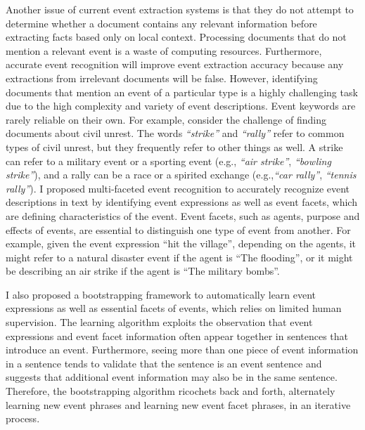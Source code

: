 Another issue of current event extraction systems is 
that they do not 
attempt to determine whether a document 
contains any relevant information 
before extracting facts based only on local context. 
Processing documents that do not mention a relevant event 
is 
a waste of computing resources. 
Furthermore, 
accurate event recognition will improve event extraction accuracy 
because any extractions from irrelevant documents 
will be false. 
However, identifying documents that mention an event of a particular type 
is a highly challenging task due to the high
complexity and variety of event descriptions. 
Event keywords are rarely reliable
on their own. 
For example, consider the challenge
of finding documents about civil unrest. The words {\it ``strike''} and
{\it ``rally''} refer to common types of civil unrest, but
they frequently refer to other things as well.  A  strike can refer
to a military event or a sporting event (e.g., {\it ``air
strike''}, {\it ``bowling strike''}), and a rally can be a race or a
spirited exchange (e.g.,{\it ``car rally''}, {\it ``tennis rally''}). 
I proposed multi-faceted event recognition to accurately recognize 
event descriptions in text by identifying event
expressions as well as event facets, which are defining characteristics of the event.
Event facets, such as agents, purpose and effects of events, 
are essential to distinguish one type of event from another. 
For example, given the event expression ``hit the village'', 
depending on the agents, it might refer to a natural disaster event if the agent is ``The flooding'', or 
it might be describing an air strike if the agent is ``The military bombs''. 

I also proposed a bootstrapping framework to 
automatically learn event expressions as well as essential facets of events, 
which 
relies on limited human supervision. 
The learning algorithm exploits the observation that event expressions and event facet information 
often appear together in sentences that introduce an event. 
Furthermore, seeing more than one piece of event information in a sentence tends to 
validate that the sentence is an event 
sentence and 
suggests that 
additional event information may also be 
in the same sentence. 
Therefore, the bootstrapping algorithm ricochets back and forth, alternately 
learning new event phrases 
and learning new 
event facet phrases, 
in an iterative process.  


